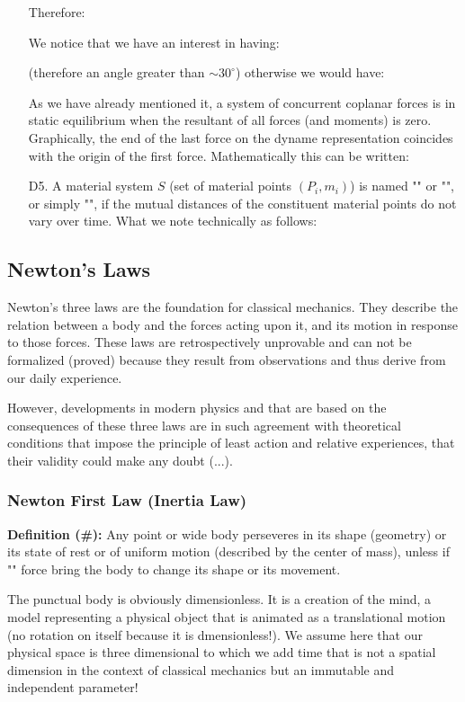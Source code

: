 \begin{enumerate}
	Therefore:
	
	We notice that we have an interest in having:
	
	(therefore an angle greater than $\sim30^{\circ}$) otherwise we would have:
	
	As we have already mentioned it, a system of concurrent coplanar forces is in static equilibrium when the resultant of all forces (and moments) is zero. Graphically, the end of the last force on the dyname representation coincides with the origin of the first force. Mathematically this can be written:
	
	\item[D5.] A material system $S$ (set of material points $(P_i,m_i)$) is named "" or "", or simply "", if the mutual distances of the constituent material points do not vary over time. What we note technically as follows:
	
	\end{enumerate}
	
	\subsection{Newton's Laws}
	Newton's three laws are the foundation for classical mechanics. They describe the relation between a body and the forces acting upon it, and its motion in response to those forces. These laws are retrospectively unprovable and can not be formalized (proved) because they result from observations and thus derive from our daily experience.
	
	However, developments in modern physics and that are based on the consequences of these three laws are in such agreement with theoretical conditions that impose the principle of least action and relative experiences, that their validity could make any doubt (...).

	
	\subsubsection{Newton First Law (Inertia Law)}
	
	\textbf{Definition (\#\mydef):} Any point or wide body perseveres in its shape (geometry) or its state of rest or of uniform motion (described by the center of mass), unless if "" force bring the body to change its shape or its movement.
	
	The punctual body is obviously dimensionless. It is a creation of the mind, a model representing a physical object that is animated as a translational motion (no rotation on itself because it is dmensionless!). We assume here that our physical space is three dimensional to which we add time that is not a spatial dimension in the context  of classical mechanics but an immutable and independent parameter!
	
